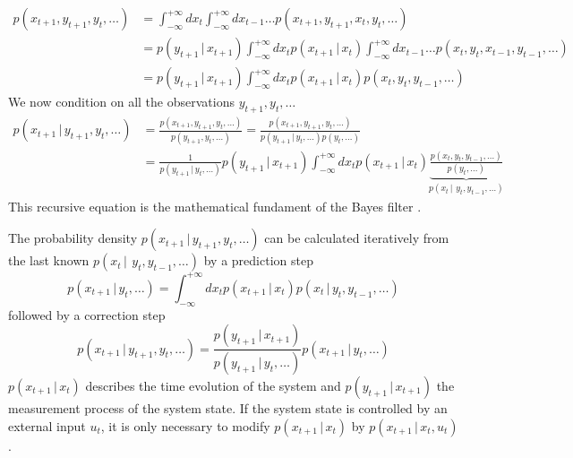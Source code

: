 \documentclass{tstextbook}
\begin{document}
\begin{equation}
\begin{aligned}
p(x_{t+1},y_{t+1},y_{t},\ldots)&=\int_{-\infty}^{+\infty}dx_{t}\int_{-\infty}^{+\infty}dx_{t-1}\ldots p(x_{t+1},y_{t+1},x_{t},y_{t},\ldots)\\
&=p(y_{t+1}\,\vert\, x_{t+1})\int_{-\infty}^{+\infty}dx_{t} p(x_{t+1}\,\vert\, x_{t})\int_{-\infty}^{+\infty}dx_{t-1}\ldots p(x_{t},y_{t},x_{t-1},y_{t-1},\ldots)\\
&=p(y_{t+1}\,\vert\, x_{t+1})\int_{-\infty}^{+\infty}dx_{t} p(x_{t+1}\,\vert\, x_{t}) p(x_{t},y_{t},y_{t-1},\ldots)
\end{aligned}
\end{equation}
We now condition on all the observations $y_{t+1},y_{t},\ldots$
\begin{equation}
\begin{aligned}
p(x_{t+1}\,\vert\, y_{t+1},y_{t},\ldots)&=\frac{p(x_{t+1},y_{t+1},y_{t},\ldots)}{p(y_{t+1},y_{t},\ldots)}
=\frac{p(x_{t+1},y_{t+1},y_{t},\ldots)}{p(y_{t+1}\,\vert\, y_{t},\ldots)p(y_{t},\ldots)}\\
&=\frac{1}{p(y_{t+1}\,\vert\, y_{t},\ldots)}p(y_{t+1}\,\vert\, x_{t+1})\int_{-\infty}^{+\infty}dx_{t} p(x_{t+1}\,\vert\, x_{t}) \underbrace{\frac{p(x_{t},y_{t},y_{t-1},\ldots)}{p(y_{t},\ldots)}}_{p(x_{t}\,\vert\,\ y_{t},y_{t-1},\ldots)}
\end{aligned}
\end{equation}
This recursive equation is the mathematical fundament of the Bayes filter \cite{gustafsson2012}.\\

\begin{definition}
  \label{th:bayesfilter}
  The probability density $p(x_{t+1}\,\vert\, y_{t+1},y_{t},\ldots)$ can be calculated iteratively from the last known $p(x_{t}\,\vert\,\ y_{t},y_{t-1},\ldots)$ by a prediction step 
\begin{equation}
p(x_{t+1}\,\vert\, y_{t},\ldots)=\int_{-\infty}^{+\infty}dx_{t} p(x_{t+1}\,\vert\, x_{t}) p(x_{t}\,\vert\, y_{t},y_{t-1},\ldots)
\end{equation}
followed by a correction step
\begin{equation}
p(x_{t+1}\,\vert\, y_{t+1},y_{t},\ldots)=\frac{p(y_{t+1}\,\vert\, x_{t+1})}{p(y_{t+1}\,\vert\, y_{t},\ldots)}p(x_{t+1}\,\vert\, y_{t},\ldots)
\end{equation}
$p(x_{t+1}\,\vert\, x_{t})$ describes the time evolution of the system and $p(y_{t+1}\,\vert\, x_{t+1})$ the measurement process of the system state. If the system state is controlled by an external input $u_t$, it is only necessary to modify $p(x_{t+1}\,\vert\, x_{t})$ by $p(x_{t+1}\,\vert\, x_{t}, u_{t})$. 
\end{definition}
\end{document}
